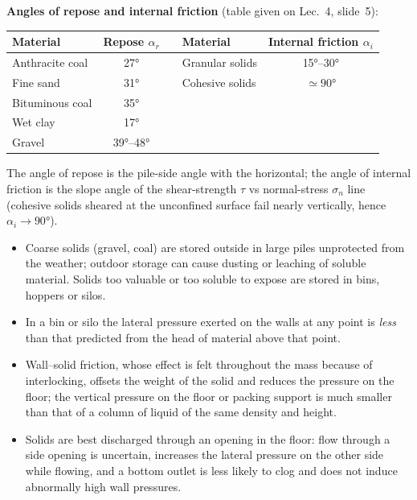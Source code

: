 \documentclass[10pt,a4paper]{article}
\newcommand{\spsub}[1]{\par\addvspace{7pt}\noindent{\color{accent}\bfseries #1}\par\addvspace{3pt}\nopagebreak}
\begin{document}
\begin{formulabox}
\textbf{Angles of repose and internal friction} (table given on Lec.~4, slide~5):
\begin{center}
\begin{tabular}{@{}lcp{4mm}lc@{}}
\toprule
\textbf{Material} & \textbf{Repose} $\alpha_r$ && \textbf{Material} & \textbf{Internal friction} $\alpha_i$\\
\midrule
Anthracite coal  & \ang{27}          && Granular solids & \ang{15}--\ang{30}\\
Fine sand        & \ang{31}          && Cohesive solids & $\simeq\ang{90}$\\
Bituminous coal  & \ang{35}          &&&\\
Wet clay         & \ang{17}          &&&\\
Gravel           & \ang{39}--\ang{48}&&&\\
\bottomrule
\end{tabular}
\end{center}
The angle of repose is the pile-side angle with the horizontal; the angle of internal friction is the slope angle of the shear-strength $\tau$ vs normal-stress $\sigma_n$ line (cohesive solids sheared at the unconfined surface fail nearly vertically, hence $\alpha_i\rightarrow\ang{90}$).
\end{formulabox}

\spsub{Bulk storage, bins and silos}
\begin{itemize}
  \item Coarse solids (gravel, coal) are stored outside in large piles unprotected from the weather; outdoor storage can cause dusting or leaching of soluble material. Solids too valuable or too soluble to expose are stored in bins, hoppers or silos.
  \item In a bin or silo the lateral pressure exerted on the walls at any point is \emph{less} than that predicted from the head of material above that point.
  \item Wall--solid friction, whose effect is felt throughout the mass because of interlocking, offsets the weight of the solid and reduces the pressure on the floor; the vertical pressure on the floor or packing support is much smaller than that of a column of liquid of the same density and height.
  \item Solids are best discharged through an opening in the floor: flow through a side opening is uncertain, increases the lateral pressure on the other side while flowing, and a bottom outlet is less likely to clog and does not induce abnormally high wall pressures.
\end{itemize}
\end{document}
